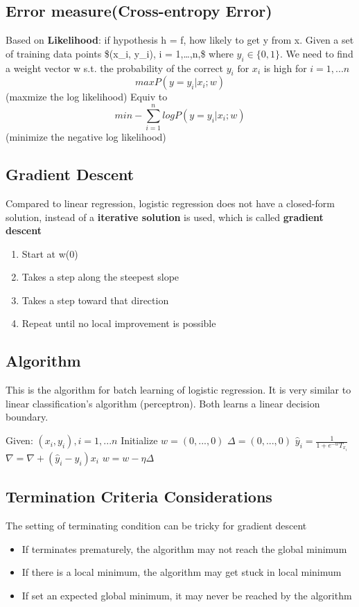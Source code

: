 \documentclass[11pt]{article}
\begin{document}
\subsection{Error measure(Cross-entropy Error)}
\label{sec:org999da21}
Based on \textbf{\textbf{Likelihood}}: if hypothesis h = f, how likely to get y from x.
Given a set of training data points \$(x\_i, y\_i), i = 1,\ldots{},n,\$ where \(y_i \in \{0, 1\}\).
We need to find a weight vector w s.t. the probability of the correct \(y_i \text{ for } x_i\) is high for \(i=1,...n\)
$$
max P(y=y_i|x_i; w)
$$ (maxmize the log likelihood)
Equiv to  
$$
min -\sum_{i=1}^n log P(y=y_i|x_i; w) 
$$ (minimize the negative log likelihood)

\subsection{Gradient Descent}
\label{sec:orgbdb97c4}
Compared to linear regression, logistic regression does not have a closed-form solution, instead of a \textbf{\textbf{iterative solution}} is used, which is called \textbf{\textbf{gradient descent}} 
\begin{enumerate}
\item Start at w(0)
\item Takes a step along the steepest slope
\item Takes a step toward that direction
\item Repeat until no local improvement is possible
\end{enumerate}

\subsection{Algorithm}
\label{sec:org4411559}
This is the algorithm for batch learning of logistic regression. It is very similar to linear classification's algorithm (perceptron). Both learns a linear decision boundary.
\begin{algorithmic}
\State Given: $(x_i, y_i), i = 1,...n$
\State Initialize $w = (0,...,0)$
\Repeat
  \State $\Delta = (0,...,0)$
    \State $\hat { y } _ { i } = \frac { 1} { 1+ e ^ { - w } T _ { x _ { i } } } $
    \State $\nabla = \nabla + \left( \hat { y } _ { i } - y _ { i } \right) x _ { i } $
  \EndFor  
  \State $w = w - \eta \Delta $
\Until{$|\Delta|\leq \epsilon$}
\end{algorithmic}

\subsection{Termination Criteria Considerations}
\label{sec:orgf868f74}
The setting of terminating condition can be tricky for gradient descent
\begin{itemize}
\item If terminates prematurely, the algorithm may not reach the global minimum
\item If there is a local minimum, the algorithm may get stuck in local minimum
\item If set an expected global minimum, it may never be reached by the algorithm
\end{itemize}
\end{document}
